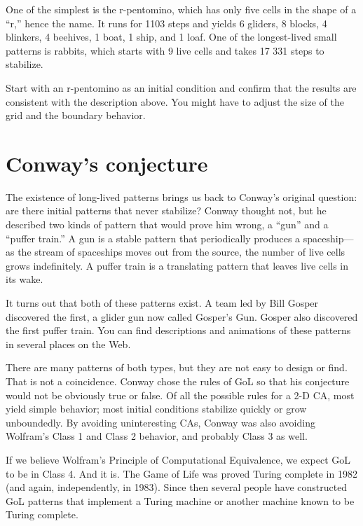 \documentclass[10pt]{book}
\begin{document}
One of the simplest is the
r-pentomino, which has only five cells in the shape of a ``r,'' hence
the name.  It runs for 1103 steps and yields 6 gliders, 8 blocks, 4
blinkers, 4 beehives, 1 boat, 1 ship, and 1 loaf.
One of the longest-lived small patterns is rabbits, which starts
with 9 live cells and takes 17 331 steps to stabilize.

\begin{exercise}

Start with an r-pentomino as an initial condition and confirm
that the results are consistent with the description above.
You might have to adjust the size of the grid and the boundary behavior.

\end{exercise}


\section{Conway's conjecture}

The existence of long-lived patterns brings us back to Conway's
original question: are there initial patterns that never stabilize?
Conway thought not, but he described two kinds of pattern that would
prove him wrong, a ``gun'' and a ``puffer train.''  A gun is a stable
pattern that periodically produces a spaceship---as the stream of
spaceships moves out from the source, the number of live cells grows
indefinitely.  A puffer train is a translating pattern that leaves
live cells in its wake.

It turns out that both of these patterns exist.  A team led
by Bill Gosper discovered the first, a glider gun now called
Gosper's Gun.  Gosper also discovered the first puffer train.
You can find descriptions and animations of these patterns
in several places on the Web.

There are many patterns of both types, but they are not easy to
design or find.  That is not a coincidence.  Conway chose the
rules of GoL so that his conjecture would not be obviously
true or false.  Of all the possible rules for a 2-D CA, most
yield simple behavior; most initial conditions stabilize quickly
or grow unboundedly.  By avoiding uninteresting CAs, Conway
was also avoiding Wolfram's Class 1 and Class 2 behavior, and
probably Class 3 as well.

If we believe Wolfram's Principle of Computational Equivalence, we
expect GoL to be in Class 4.  And it is.  The Game of Life was proved
Turing complete in 1982 (and again, independently, in 1983).
Since then several people have constructed GoL patterns that implement
a Turing machine or another machine known to be Turing complete.
\end{document}
